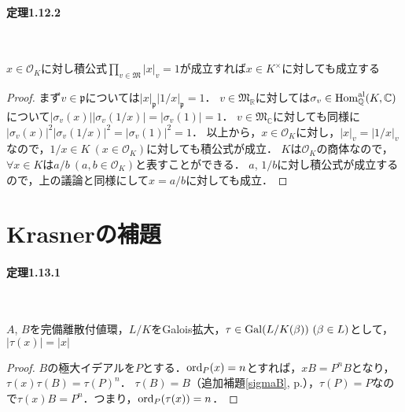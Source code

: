 \paragraph{定理1.12.2}~
\begin{screen}
  $x\in\mathcal{O}_K$に対し積公式$\prod_{v\in\mathfrak{M}}\lvert x\rvert_v=1$が成立すれば$x\in K^\times$に対しても成立する
\end{screen}
\begin{proof}
  まず$v\in\mathfrak{p}$については$\lvert x\rvert_\mathfrak{p}\lvert 1/x\rvert_\mathfrak{p}=1$．
  $v\in\mathfrak{M}_\mathbb{R}$に対しては$\sigma_v\in\operatorname{Hom}^\text{al}_\mathbb{Q}(K,\mathbb{C})$について$\lvert\sigma_v(x)\rvert\lvert\sigma_v(1/x)\rvert=\lvert\sigma_v(1)\rvert=1$．
  $v\in\mathfrak{M}_\mathbb{C}$に対しても同様に$\lvert\sigma_v(x)\rvert^2\lvert\sigma_v(1/x)\rvert^2=\lvert\sigma_v(1)\rvert^2=1$．
  以上から，$x\in\mathcal{O}_K$に対し，$\lvert x\rvert_v=\lvert 1/x\rvert_v$なので，$1/x\in K\ (x\in\mathcal{O}_K)$に対しても積公式が成立．
  $K$は$\mathcal{O}_K$の商体なので，$\forall x\in K$は$a/b\ (a,b\in\mathcal{O}_K)$と表すことができる．
  $a$, $1/b$に対し積公式が成立するので，上の議論と同様にして$x=a/b$に対しても成立．
\end{proof}

\section{Krasnerの補題}

\paragraph{定理1.13.1}~
\begin{screen}
  $A$, $B$を完備離散付値環，$L/K$をGalois拡大，$\tau\in\operatorname{Gal}(L/K(\beta))\ (\beta\in L)$として，$\lvert\tau(x)\rvert=\lvert x\rvert$
\end{screen}
\begin{proof}
  $B$の極大イデアルを$P$とする．$\operatorname{ord}_P(x)=n$とすれば，$xB=P^nB$となり，$\tau(x) \tau(B) = \tau(P)^n$．
  $\tau(B)=B$（追加補題\ref{sigmaB}, p.\pageref{sigmaB}），$\tau(P)=P$なので$\tau(x)B=P^n$．つまり，$\operatorname{ord}_P(\tau(x))=n$．
\end{proof}

